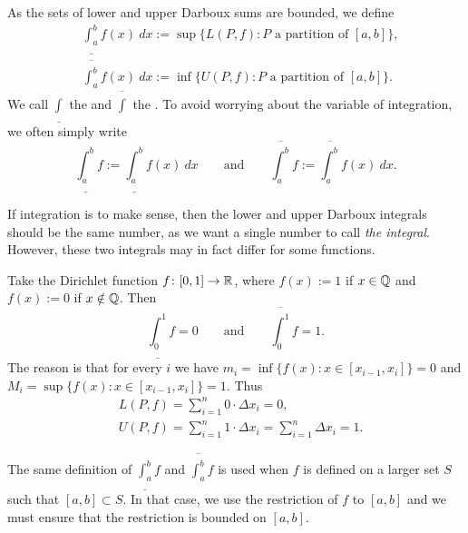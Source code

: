 \begin{defn}
As the sets of lower and upper Darboux sums are bounded, we define
\begin{align*}
& \underline{\int_a^b} f(x)~dx :=
\sup \bigl\{ L(P,f) : P \text{ a partition of $[a,b]$} \bigr\} , \\
& \overline{\int_a^b} f(x)~dx :=
\inf \bigl\{ U(P,f) : P \text{ a partition of $[a,b]$} \bigr\} .
\end{align*}
We call $\underline{\int}$ the \emph{} and
$\overline{\int}$ the \emph{}.
To avoid worrying about the variable of integration, 
we often simply write
\begin{equation*}
\underline{\int_a^b} f :=
\underline{\int_a^b} f(x)~dx 
\qquad \text{and} \qquad
\overline{\int_a^b} f :=
\overline{\int_a^b} f(x)~dx  .
\end{equation*}
\end{defn}

If integration is to make sense, then the lower and upper Darboux
integrals should be the same number, as we want a single number to call
\emph{the integral}.  However, these two integrals may in fact differ for
some functions.

\begin{example}
Take the Dirichlet function $f \colon [0,1] \to {\mathbb{R}}$, where $f(x) := 1$ if
$x \in {\mathbb{Q}}$ and $f(x) := 0$ if $x \notin {\mathbb{Q}}$.  Then
\begin{equation*}
\underline{\int_0^1} f = 0 \qquad \text{and} \qquad
\overline{\int_0^1} f = 1 .
\end{equation*}
The reason is that for every $i$ we have 
$m_i = \inf \{ f(x) : x \in [x_{i-1},x_i] \} = 0$  and
$M_i = \sup \{ f(x) : x \in [x_{i-1},x_i] \} = 1$.  Thus
\begin{align*}
& L(P,f) = \sum_{i=1}^n 0 \cdot \Delta x_i = 0 , \\
& U(P,f) = \sum_{i=1}^n 1 \cdot \Delta x_i = \sum_{i=1}^n \Delta x_i = 1  .
\end{align*}
\end{example}

\begin{remark}
The same definition of $\underline{\int_a^b} f$ and
$\overline{\int_a^b} f$
is used when $f$ is defined on a larger set $S$ such that
$[a,b] \subset S$.  In that case, we use the restriction of $f$ to $[a,b]$
and we must ensure that the restriction is bounded on $[a,b]$.
\end{remark}

